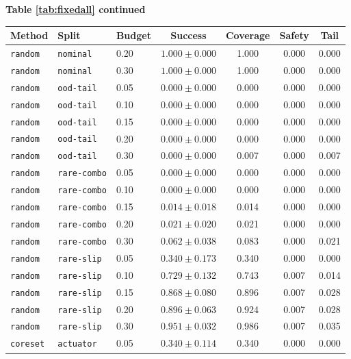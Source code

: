 \documentclass{article}
\begin{document}
\begin{center}
\textbf{Table \ref{tab:fixedall} continued}\\[0.4ex]
\begin{tabular}{lllcccc}
\toprule
Method & Split & Budget & Success & Coverage & Safety & Tail \\
\midrule
\texttt{random} & \texttt{nominal} & 0.20 & $1.000 \pm 0.000$ & 1.000 & 0.000 & 0.000 \\
\texttt{random} & \texttt{nominal} & 0.30 & $1.000 \pm 0.000$ & 1.000 & 0.000 & 0.000 \\
\texttt{random} & \texttt{ood-tail} & 0.05 & $0.000 \pm 0.000$ & 0.000 & 0.000 & 0.000 \\
\texttt{random} & \texttt{ood-tail} & 0.10 & $0.000 \pm 0.000$ & 0.000 & 0.000 & 0.000 \\
\texttt{random} & \texttt{ood-tail} & 0.15 & $0.000 \pm 0.000$ & 0.000 & 0.000 & 0.000 \\
\texttt{random} & \texttt{ood-tail} & 0.20 & $0.000 \pm 0.000$ & 0.000 & 0.000 & 0.000 \\
\texttt{random} & \texttt{ood-tail} & 0.30 & $0.000 \pm 0.000$ & 0.007 & 0.000 & 0.007 \\
\texttt{random} & \texttt{rare-combo} & 0.05 & $0.000 \pm 0.000$ & 0.000 & 0.000 & 0.000 \\
\texttt{random} & \texttt{rare-combo} & 0.10 & $0.000 \pm 0.000$ & 0.000 & 0.000 & 0.000 \\
\texttt{random} & \texttt{rare-combo} & 0.15 & $0.014 \pm 0.018$ & 0.014 & 0.000 & 0.000 \\
\texttt{random} & \texttt{rare-combo} & 0.20 & $0.021 \pm 0.020$ & 0.021 & 0.000 & 0.000 \\
\texttt{random} & \texttt{rare-combo} & 0.30 & $0.062 \pm 0.038$ & 0.083 & 0.000 & 0.021 \\
\texttt{random} & \texttt{rare-slip} & 0.05 & $0.340 \pm 0.173$ & 0.340 & 0.000 & 0.000 \\
\texttt{random} & \texttt{rare-slip} & 0.10 & $0.729 \pm 0.132$ & 0.743 & 0.007 & 0.014 \\
\texttt{random} & \texttt{rare-slip} & 0.15 & $0.868 \pm 0.080$ & 0.896 & 0.007 & 0.028 \\
\texttt{random} & \texttt{rare-slip} & 0.20 & $0.896 \pm 0.063$ & 0.924 & 0.007 & 0.028 \\
\texttt{random} & \texttt{rare-slip} & 0.30 & $0.951 \pm 0.032$ & 0.986 & 0.007 & 0.035 \\
\texttt{coreset} & \texttt{actuator} & 0.05 & $0.340 \pm 0.114$ & 0.340 & 0.000 & 0.000 \\

\end{tabular}
\end{center}
\end{document}
